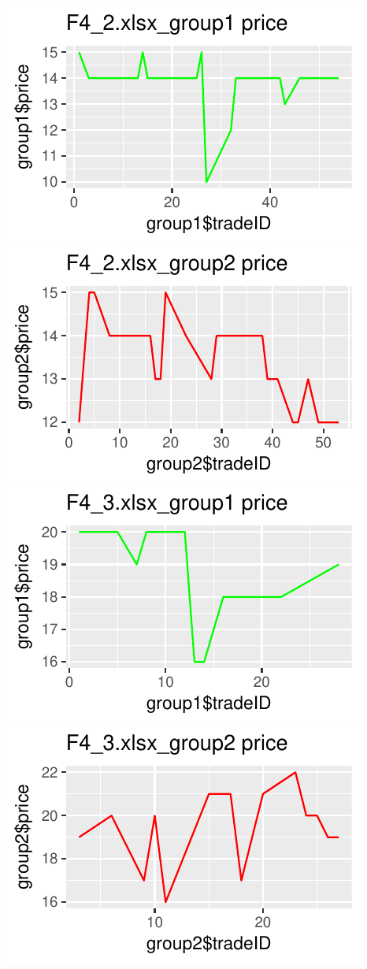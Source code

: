 \documentclass[]{article}
\begin{document}
\includegraphics{finance_homework_files/figure-latex/unnamed-chunk-5-1.pdf}
\includegraphics{finance_homework_files/figure-latex/unnamed-chunk-5-2.pdf}
\includegraphics{finance_homework_files/figure-latex/unnamed-chunk-5-3.pdf}
\includegraphics{finance_homework_files/figure-latex/unnamed-chunk-5-4.pdf}
\end{document}
